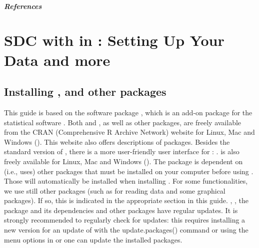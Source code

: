\documentclass[letterpaper,10pt,english]{sphinxmanual}
\begin{document}
\paragraph{References}


\chapter{SDC with  in : Setting Up Your Data and more}
\label{\detokenize{sdcMicro:sdc-with-sdcmicro-in-r-setting-up-your-data-and-more}}\label{\detokenize{sdcMicro::doc}}

\section{Installing ,  and other packages}
\label{\detokenize{sdcMicro:installing-r-sdcmicro-and-other-packages}}
This guide is based on the software package , which is an
add-on package for the statistical software . Both  and
, as well as other  packages, are freely available from the
CRAN (Comprehensive R Archive Network) website for Linux, Mac and
Windows (). This website also offers
descriptions of packages. Besides the standard version of , there is
a more user-friendly user interface for : .  is
also freely available for Linux, Mac and Windows
(). The  package is dependent on (i.e.,
uses) other  packages that must be installed on your computer before
using . Those will automatically be installed when installing
. For some functionalities, we use still other packages (such
as  for reading data and some graphical packages). If so, this
is indicated in the appropriate section in this guide. , ,
the  package and its dependencies and other packages have
regular updates. It is strongly recommended to regularly check for
updates: this requires installing a new version for an update of 
with the update.packages() command or using the menu options in  or
 one can update the installed packages.
\end{document}
